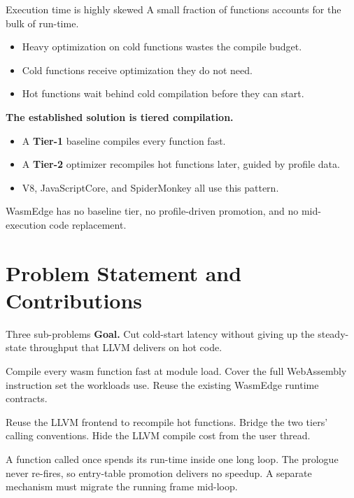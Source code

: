 \documentclass[aspectratio=169,11pt]{beamer}
\newcommand{\tone}{\textbf{\textcolor{tier1}{Tier-1}}}
\newcommand{\ttwo}{\textbf{\textcolor{tier2}{Tier-2}}}
\begin{document}
\begin{frame}{Execution time is highly skewed}
  A small fraction of functions accounts for the bulk of run-time.
  \vspace{0.3em}
  \begin{itemize}\setlength{\itemsep}{2pt}
    \item Heavy optimization on cold functions wastes the compile budget.
    \item Cold functions receive optimization they do not need.
    \item Hot functions wait behind cold compilation before they can start.
  \end{itemize}
  \vspace{0.7em}
  \textbf{The established solution is tiered compilation.}
  \begin{itemize}\setlength{\itemsep}{2pt}
    \item A \tone{} baseline compiles every function fast.
    \item A \ttwo{} optimizer recompiles hot functions later, guided by profile data.
    \item V8, JavaScriptCore, and SpiderMonkey all use this pattern.
  \end{itemize}
  \vspace{0.5em}
  \alert{WasmEdge has no baseline tier, no profile-driven promotion, and no mid-execution code replacement.}
\end{frame}


\section{Problem Statement and Contributions}

\begin{frame}{Three sub-problems}
  \textbf{Goal.}
  Cut cold-start latency without giving up the steady-state throughput that LLVM delivers on hot code.
  \vspace{0.4em}
  \begin{description}\setlength{\itemsep}{0.5em}
    \item[\tone{} baseline.]
      Compile every wasm function fast at module load.
      Cover the full WebAssembly instruction set the workloads use.
      Reuse the existing WasmEdge runtime contracts.
    \item[\ttwo{} optimizer.]
      Reuse the LLVM frontend to recompile hot functions.
      Bridge the two tiers' calling conventions.
      Hide the LLVM compile cost from the user thread.
    \item[In-flight migration.]
      A function called once spends its run-time inside one long loop.
      The prologue never re-fires, so entry-table promotion delivers no speedup.
      A separate mechanism must migrate the running frame mid-loop.
  \end{description}
\end{frame}
\end{document}
